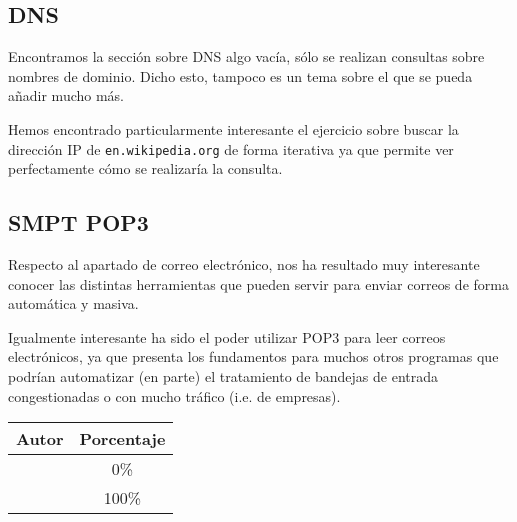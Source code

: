 \subsection{DNS}

Encontramos la sección sobre DNS algo vacía, sólo se realizan consultas sobre nombres de dominio.
Dicho esto, tampoco es un tema sobre el que se pueda añadir mucho más.

Hemos encontrado particularmente interesante el ejercicio sobre buscar la dirección IP de
\verb#en.wikipedia.org# de forma iterativa ya que permite ver perfectamente cómo se realizaría
la consulta.

\subsection{SMPT POP3}

Respecto al apartado de correo electrónico, nos ha resultado muy interesante conocer
las distintas herramientas que pueden servir para enviar correos de forma automática
y masiva.

Igualmente interesante ha sido el poder utilizar POP3 para leer correos electrónicos,
ya que presenta los fundamentos para muchos otros programas que podrían automatizar
(en parte) el tratamiento de bandejas de entrada congestionadas o con mucho tráfico
(i.e. de empresas).

\begin{center}
	\begin{tabular}{|c|c|}
		\hline
		\textbf{Autor} & \textbf{Porcentaje} \\
		\hline
		\hline
		\authorOne & 0\% \\
		\authorTwo & 100\% \\
		\hline
	\end{tabular}
\end{center}
